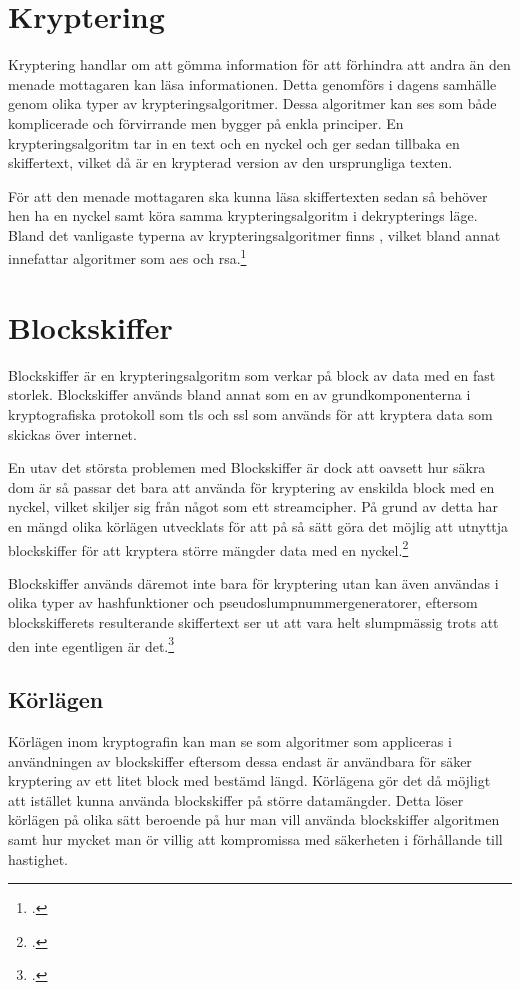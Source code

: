 
\section{Kryptering}
Kryptering handlar om att gömma information för att förhindra att andra än den menade mottagaren kan läsa informationen.
Detta genomförs i dagens samhälle genom olika typer av krypteringsalgoritmer. Dessa algoritmer kan ses som både komplicerade
och förvirrande men bygger på enkla principer. En krypteringsalgoritm tar in en text och en nyckel och ger sedan tillbaka en
skiffertext, vilket då är en krypterad version av den ursprungliga texten.

För att den menade mottagaren ska kunna läsa skiffertexten sedan så behöver hen ha en nyckel samt köra samma krypteringsalgoritm
i dekrypterings läge. Bland det vanligaste typerna av krypteringsalgoritmer finns ,
vilket bland annat innefattar algoritmer som \acrshort{aes} och \gls{rsa}.\footcite{kryptering}

\section{Blockskiffer}
\label{sec:blockskiffer}
Blockskiffer är en krypteringsalgoritm som verkar på block av data med en fast storlek.
Blockskiffer används bland annat som en av grundkomponenterna i kryptografiska protokoll som \acrfull{tls} och \acrfull{ssl}
som används för att kryptera data som skickas över internet.

En utav det största problemen med Blockskiffer är dock att oavsett hur säkra dom är så passar det bara att använda
för kryptering av enskilda block med en nyckel, vilket skiljer sig från något som ett \gls{streamcipher}.
På grund av detta har en mängd olika körlägen utvecklats för att på så sätt göra det möjlig att utnyttja
blockskiffer för att kryptera större mängder data med en nyckel.\footcite{blockskiffer-ref}

Blockskiffer används däremot inte bara för kryptering utan kan även användas i olika typer av \gls{hashfunktion}er
och \gls{pseudoslump}nummergeneratorer, eftersom blockskifferets resulterande skiffertext ser ut att vara helt slumpmässig
trots att den inte egentligen är det.\footcite{blockskiffer-ref}

\subsection{Körlägen}
Körlägen inom kryptografin kan man se som algoritmer som appliceras i användningen av
blockskiffer eftersom dessa endast är användbara för säker kryptering av ett litet block med bestämd längd.
Körlägena gör det då möjligt att istället kunna använda blockskiffer på större datamängder.
Detta löser körlägen på olika sätt beroende på hur man vill använda blockskiffer algoritmen samt hur
mycket man ör villig att kompromissa med säkerheten i förhållande till hastighet.

